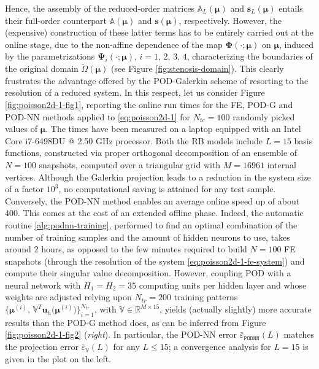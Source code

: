 \documentclass[12pt, a4paper, twoside, openright]{report}
\numberwithin{equation}{chapter}
\theoremstyle{theorem}
\theoremstyle{definition}
\theoremstyle{remark}
\theoremstyle{proposition}
\numberwithin{figure}{chapter}
\newcommand{\wt}[1]{\widetilde{#1}}
\newcommand{\bg}[1]{\boldsymbol{#1}}
\begin{document}
		Hence, the assembly of the reduced-order matrices $\mathbb{A}_L(\bg{\mu})$ and $\mathbf{s}_L(\bg{\mu})$ entails their full-order counterpart $\mathbb{A}(\bg{\mu})$ and $\mathbf{s}(\bg{\mu})$, respectively. However, the (expensive) construction of these latter terms has to be entirely carried out at the online stage, due to the non-affine dependence of the map $\bg{\Phi}(\cdot; \bg{\mu})$ on $\bg{\mu}$, induced by the parametrizations $\bg{\Psi}_i(\cdot; \bg{\mu})$, $i = 1, \, 2, \, 3, \, 4$, characterizing the boundaries of the original domain $\wt{\Omega}(\bg{\mu})$ (see Figure \ref{fig:stenosis-domain}). This clearly frustrates the advantage offered by the POD-Galerkin scheme of resorting to the resolution of a reduced system. In this respect, let us consider Figure \ref{fig:poisson2d-1-fig1}, reporting the online run times for the FE, POD-G and POD-NN methods applied to \eqref{eq:poisson2d-1} for $N_{te} = 100$ randomly picked values of $\bg{\mu}$. The times have been measured on a laptop equipped with an Intel Core i7-6498DU @ 2.50 GHz processor. Both the RB models include $L = 15$ basis functions, constructed via proper orthogonal decomposition of an ensemble of $N = 100$ snapshots, computed over a triangular grid with $M = 16961$ internal vertices. Although the Galerkin projection leads to a reduction in the system size of a factor $10^3$, no computational saving is attained for any test sample. Conversely, the POD-NN method enables an average online speed up of about $400$. This comes at the cost of an extended offline phase. Indeed, the automatic routine \ref{alg:podnn-training}, performed to find an optimal combination of the number of training samples and the amount of hidden neurons to use, takes around $2$ hours, as opposed to the few minutes required to build $N = 100$ FE snapshots (through the resolution of the system \eqref{eq:poisson2d-1-fe-system}) and compute their singular value decomposition. However, coupling POD with a neural network with $H_1 = H_2 = 35$ computing units per hidden layer and whose weights are adjusted relying upon $N_{tr} = 200$ training patterns $\big\lbrace \bg{\mu}^{(i)}, \, \mathbb{V}^T \mathbf{u}_h \big( \bg{\mu}^{(i)} \big) \big\rbrace_{i = 1}^{N_{tr}}$, with $\mathbb{V} \in \mathbb{R}^{M \times 15}$, yields (actually slightly) more accurate results than the POD-G method does, as can be inferred from Figure \ref{fig:poisson2d-1-fig2} (\emph{right}). In particular, the POD-NN error $\bar{\varepsilon}_{\texttt{PODNN}}^{}(L)$ matches the projection error $\bar{\varepsilon}_{\mathbb{V}}^{}(L)$ for any $L \leq 15$; a convergence analysis for $L = 15$ is given in the plot on the left.
		
\end{document}
